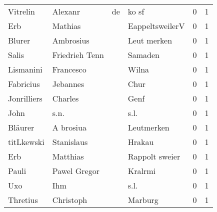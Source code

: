 \begin{tabular}{llllrr}
                 Vitrelin &                            Alexanr &          de &                                       ko sf &          0 &         1 \\
                      Erb &                            Mathias &             &                             EappeltsweilerV &          0 &         1 \\
                   Blurer &                          Ambrosius &             &                                 Leut merken &          0 &         1 \\
                    Salis &                     Friedrieh Tenn &             &                                     Samaden &          0 &         1 \\
                Lismanini &                          Francesco &             &                                       Wilna &          0 &         1 \\
                Fabricius &                           Jebannes &             &                                        Chur &          0 &         1 \\
              Jonrilliers &                            Charles &             &                                        Genf &          0 &         1 \\
                     John &                               s.n. &             &                                        s.l. &          0 &         1 \\
                  Bläurer &                          A brosiua &             &                                  Leutmerken &          0 &         1 \\
               titLkewski &                         Stanislaus &             &                                      Hrakau &          0 &         1 \\
                      Erb &                           Matthias &             &                              Rappolt sweier &          0 &         1 \\
                    Pauli &                       Pawel Gregor &             &                                     Kralrmi &          0 &         1 \\
                      Uxo &                                Ihm &             &                                        s.l. &          0 &         1 \\
                 Thretius &                          Christoph &             &                                     Marburg &          0 &         1 \\

\end{tabular}
